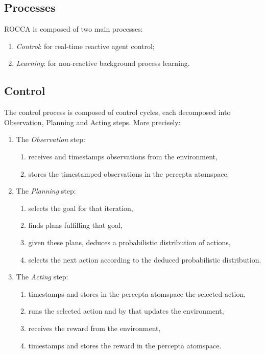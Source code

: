 \documentclass[runningheads]{llncs}
\begin{document}
\subsection{Processes}

ROCCA is composed of two main processes:
\begin{enumerate}
\item \emph{Control}: for real-time reactive agent control;
\item \emph{Learning}: for non-reactive background process learning.
\end{enumerate}

\subsection{Control}
The control process is composed of control cycles, each decomposed
into Observation, Planning and Acting steps.  More precisely:
\begin{enumerate}
\item The \emph{Observation} step:
  \begin{enumerate}
  \item receives and timestamps observations from the environment,
  \item stores the timestamped observations in the percepta atomspace.
  \end{enumerate}
\item The \emph{Planning} step:
  \begin{enumerate}
  \item selects the goal for that iteration,
  \item finds plans fulfilling that goal,
  \item given these plans, deduces a probabilistic distribution of
    actions,
  \item selects the next action according to the deduced probabilistic
    distribution.
  \end{enumerate}
\item The \emph{Acting} step:
  \begin{enumerate}
  \item timestamps and stores in the percepta atomspace the selected
    action,
  \item runs the selected action and by that updates the environment,
  \item receives the reward from the environment,
  \item timestamps and stores the reward in the percepta atomspace.
  \end{enumerate}
\end{enumerate}
\end{document}
